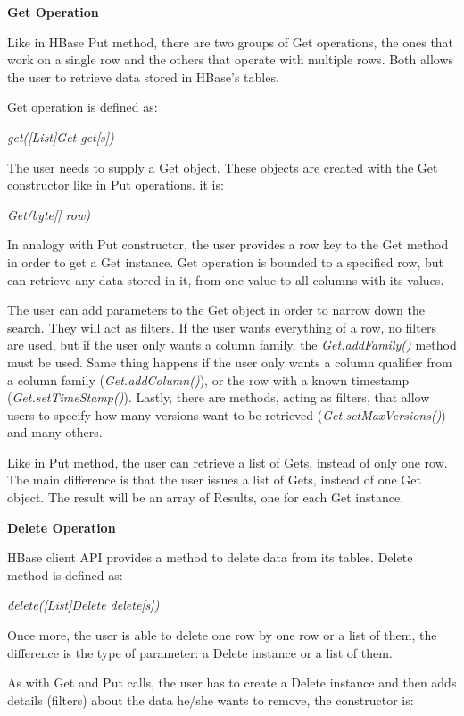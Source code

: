 \bigskip
\textbf{Get Operation}

Like in HBase Put method, there are two groups of Get operations, the ones that work on a single row and the others that operate with multiple rows. Both allows the user to retrieve data stored in HBase's tables.
\par
Get operation is defined as:
\par
\bigskip
\centerline{\textit{get([List]Get get[s])}}
\bigskip
The user needs to supply a Get object. These objects are created with the Get constructor like in Put operations. it is:
\par
\bigskip
\centerline{\textit{Get(byte[] row)}}
\bigskip
In analogy with Put constructor, the user provides a row key to the Get method in order to get a Get instance. Get operation is bounded to a specified row, but can retrieve any data stored in it, from one value to all columns with its values.
\par
The user can add parameters to the Get object in order to narrow down the search. They will act as filters. If the user wants everything of a row, no filters are used, but if the user only wants a column family, the \textit{Get.addFamily()} method must be used. Same thing happens if the user only wants a column qualifier from a column family (\textit{Get.addColumn()}), or the row with a known timestamp (\textit{Get.setTimeStamp()}).
Lastly, there are methods, acting as filters, that allow users to specify how many versions want to be retrieved (\textit{Get.setMaxVersions()}) and many others.
\par
Like in Put method, the user can retrieve a list of Gets, instead of only one row. The main difference is that the user issues a list of Gets, instead of one Get object. The result will be an array of Results, one for each Get instance.

\bigskip
\textbf{Delete Operation}

HBase client API provides a method to delete data from its tables. Delete method is defined as:

\par
\bigskip
\centerline{\textit{delete([List]Delete delete[s])}}
\bigskip
Once more, the user is able to delete one row by one row or a list of them, the difference is the type of parameter: a Delete instance or a list of them.
\par
As with Get and Put calls, the user has to create a Delete instance and then adds details (filters) about the data he/she wants to remove, the constructor is:

